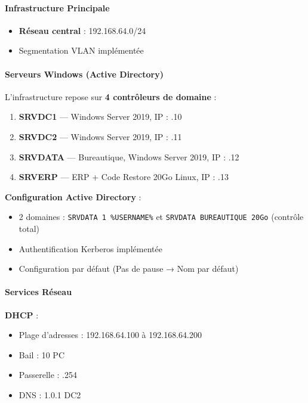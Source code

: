 \paragraph{Infrastructure Principale}
\begin{itemize}
	\item \textbf{Réseau central} : 192.168.64.0/24
	\item Segmentation VLAN implémentée
\end{itemize}

\paragraph{Serveurs Windows (Active Directory)}
\noindent L'infrastructure repose sur \textbf{4 contrôleurs de domaine} :

\begin{enumerate}
	\item \textbf{SRVDC1} — Windows Server 2019, IP : .10
	\item \textbf{SRVDC2} — Windows Server 2019, IP : .11
	\item \textbf{SRVDATA} — Bureautique, Windows Server 2019, IP : .12
	\item \textbf{SRVERP} — ERP + Code Restore 20Go Linux, IP : .13
\end{enumerate}

\newpage

\noindent \textbf{Configuration Active Directory} :
\begin{itemize}
	\item 2 domaines : \texttt{SRVDATA 1 \%USERNAME\%} et \texttt{SRVDATA BUREAUTIQUE 20Go} (contrôle total)
	\item Authentification Kerberos implémentée
	\item Configuration par défaut (Pas de pause → Nom par défaut)
\end{itemize}

\paragraph{Services Réseau}
\noindent \textbf{DHCP} :
\begin{itemize}
	\item Plage d'adresses : 192.168.64.100 à 192.168.64.200
	\item Bail : 10 PC
	\item Passerelle : .254
	\item DNS : 1.0.1 DC2
\end{itemize}

